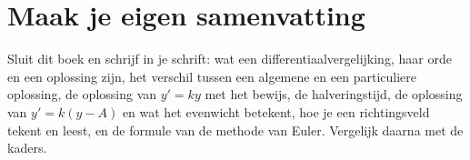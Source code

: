 \begin{oefeningen}


\end{oefeningen}


\begin{oefeningen}






\end{oefeningen}


\ifzelfstudie
\section*{Maak je eigen samenvatting}
Sluit dit boek en schrijf in je schrift: wat een differentiaalvergelijking, haar orde en een oplossing zijn, het verschil tussen een algemene en een particuliere oplossing, de oplossing van $y' = ky$ met het bewijs, de halveringstijd, de oplossing van $y' = k(y - A)$ en wat het evenwicht betekent, hoe je een richtingsveld tekent en leest, en de formule van de methode van Euler. Vergelijk daarna met de kaders.
\fi
